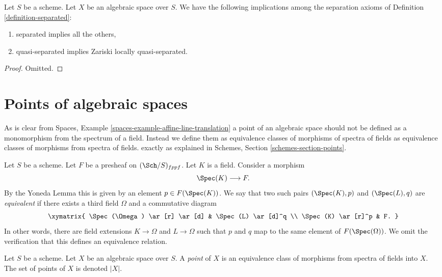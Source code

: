 \begin{lemma}
\label{lemma-trivial-implications}
Let $S$ be a scheme.
Let $X$ be an algebraic space over $S$.
We have the following implications among the separation axioms
of Definition \ref{definition-separated}:
\begin{enumerate}
\item separated implies all the others,
\item quasi-separated implies Zariski locally quasi-separated.
\end{enumerate}
\end{lemma}

\begin{proof}
Omitted.
\end{proof}











\section{Points of algebraic spaces}
\label{section-points}

\noindent
As is clear from
Spaces, Example \ref{spaces-example-affine-line-translation}
a point of an algebraic space should not be defined as a monomorphism
from the spectrum of a field.
Instead we define them as equivalence classes of morphisms of spectra
of fields as equivalence classes of morphisms from spectra of fields.
exactly as explained in
Schemes, Section \ref{schemes-section-points}.

\medskip\noindent
Let $S$ be a scheme.
Let $F$ be a presheaf on $(\Sch/S)_{fppf}$.
Let $K$ is a field. Consider a morphism
$$
\Spec(K) \longrightarrow F.
$$
By the Yoneda Lemma this is given by an
element $p \in F(\Spec(K))$. We say that two such
pairs $(\Spec(K), p)$ and $(\Spec(L), q)$
are {\it equivalent} if there exists
a third field $\Omega$ and a commutative diagram
$$
\xymatrix{
\Spec(\Omega) \ar[r] \ar[d] &
\Spec(L) \ar[d]^q \\
\Spec(K) \ar[r]^p &
F.
}
$$
In other words, there are field extensions
$K \to \Omega$ and $L \to \Omega$ such that
$p$ and $q$ map to the same element
of $F(\Spec(\Omega))$. We omit the verification that this
defines an equivalence relation.

\begin{definition}
\label{definition-points}
Let $S$ be a scheme. Let $X$ be an algebraic space over $S$.
A {\it point} of $X$ is an equivalence class of morphisms
from spectra of fields into $X$.
The set of points of $X$ is denoted $|X|$.
\end{definition}

